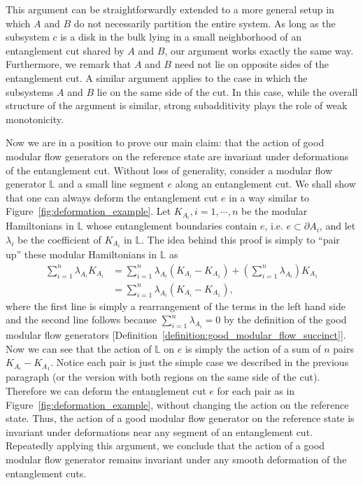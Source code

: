 \documentclass[12pt, nofootinbib]{article}
\theoremstyle{plain}
\theoremstyle{assumption}
\theoremstyle{definition}
\theoremstyle{plain}
\theoremstyle{plain}
\theoremstyle{plain}
\theoremstyle{plain}
\theoremstyle{plain}
\def\Lb{\mathbb{L}}
\begin{document}
This argument can be straightforwardly extended to a more general setup in which $A$ and $B$ do not necessarily partition the entire system. As long as the subsystem $c$ is a disk in the bulk lying in a small neighborhood of an entanglement cut shared by $A$ and $B$, our argument works exactly the same way. Furthermore, we remark that $A$ and $B$ need not lie on opposite sides of the entanglement cut. A similar argument applies to the case in which the subsystems $A$ and $B$ lie on the same side of the cut. In this case, while the overall structure of the argument is similar, strong subadditivity plays the role of weak monotonicity. 

Now we are in a position to prove our main claim: that the action of good modular flow generators on the reference state are invariant under deformations of the entanglement cut. Without loss of generality, consider a modular flow generator $\Lb$ and a small line segment $e$ along an entanglement cut. We shall show that one can always deform the entanglement cut $e$ in a way similar to Figure~\ref{fig:deformation_example}. Let $K_{A_i}, i=1,\cdots,n$ be the modular Hamiltonians in $\Lb$ whose entanglement boundaries contain $e$, i.e. $e\subset \partial A_i$, and let $\lambda_i$ be the coefficient of $K_{A_i}$ in $\Lb$. The idea behind this proof is simply to ``pair up'' these modular Hamiltonians in $\Lb$ as
\begin{equation}\begin{split}
    \sum_{i=1}^n \lambda_{A_i}K_{A_i} &= \sum_{i=1}^n \lambda_{A_i}(K_{A_i}-K_{A_1}) + \left(\sum_{i=1}^n \lambda_{A_i}\right) K_{A_1} \\ 
    &= \sum_{i=1}^n \lambda_{A_i}(K_{A_i}-K_{A_1}),
\end{split}
\end{equation}
where the first line is simply a rearrangement of the terms in the left hand side and the second line follows because $\sum_{i=1}^{n}\lambda_{A_i}=0$ by the definition of the good modular flow generators [Definition~\ref{definition:good_modular_flow_succinct}]. Now we can see that the action of $\Lb$ on $e$ is simply the action of a sum of $n$ pairs $K_{A_i}-K_{A_1}$. Notice each pair is just the simple case we described in the previous paragraph (or the version with both regions on the same side of the cut). Therefore we can deform the entanglement cut $e$ for each pair as in Figure~\ref{fig:deformation_example}, without changing the action on the reference state. Thus, the action of a good modular flow generator on the reference state is invariant under deformations near any segment of an entanglement cut. Repeatedly applying this argument, we conclude that the action of a good modular flow generator remains invariant under any smooth deformation of the entanglement cuts. 
\end{document}
